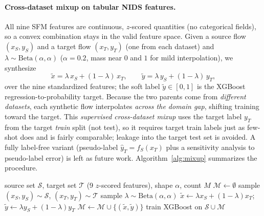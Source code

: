 \documentclass[preprint,12pt,authoryear]{elsarticle}
\begin{document}
\paragraph{Cross-dataset mixup on tabular NIDS features.} All nine SFM features are
continuous, $z$-scored quantities (no categorical fields), so a convex combination
stays in the valid feature space. Given a source flow $(x_S, y_S)$ and a target flow
$(x_T, y_T)$ (one from each dataset) and $\lambda \sim \mathrm{Beta}(\alpha,\alpha)$
($\alpha=0.2$, mass near $0$ and $1$ for mild interpolation), we synthesize
\begin{equation}
\tilde{x} = \lambda\, x_S + (1-\lambda)\, x_T,
\qquad
\tilde{y} = \lambda\, y_S + (1-\lambda)\, y_T,
\label{eq:mixup}
\end{equation}
over the nine standardized features; the soft label $\tilde{y}\in[0,1]$ is the
XGBoost regression-to-probability target. Because the two parents come from
\emph{different datasets}, each synthetic flow interpolates \emph{across the domain
gap}, shifting training toward the target. This \emph{supervised cross-dataset
mixup} uses the target label $y_T$ from the target \emph{train} split (not test), so
it requires target train labels just as few-shot does and is fairly comparable;
leakage into the target test set is avoided. A fully label-free variant (pseudo-label
$\hat{y}_T = f_S(x_T)$ plus a sensitivity analysis to pseudo-label error) is left as
future work. Algorithm~\ref{alg:mixup} summarizes the procedure.

\begin{algorithm}[htbp]
\caption{Cross-dataset mixup for tabular NIDS features}
\label{alg:mixup}
\begin{algorithmic}[1]
\Require source set $\mathcal{S}$, target set $\mathcal{T}$ (9 $z$-scored
features), shape $\alpha$, count $M$
\State $\mathcal{M} \gets \emptyset$
  \State sample $(x_S,y_S)\sim\mathcal{S}$, $(x_T,y_T)\sim\mathcal{T}$
  \State sample $\lambda \sim \mathrm{Beta}(\alpha,\alpha)$
  \State $\tilde{x} \gets \lambda x_S + (1-\lambda) x_T$;\;
         $\tilde{y} \gets \lambda y_S + (1-\lambda) y_T$
  \State $\mathcal{M} \gets \mathcal{M} \cup \{(\tilde{x},\tilde{y})\}$
\EndFor
\State \Return train XGBoost on $\mathcal{S}\cup\mathcal{M}$
\end{algorithmic}
\end{algorithm}
\end{document}
